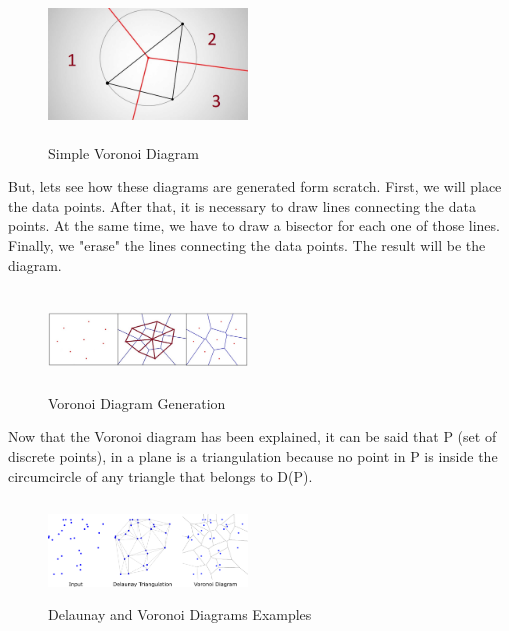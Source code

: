 \documentclass[conference]{IEEEtran}
\begin{document}
\begin{figure}[H]
    \centering
    \includegraphics[width=200,height=150,keepaspectratio]{maxresdefault2.jpg}
    \caption{Simple Voronoi Diagram}
    \label{fig:VoronoiDiagram1}
\end{figure}

But, lets see how these diagrams are generated form scratch. First, we will place the data points. After that, it is necessary to draw lines connecting the data points. At the same time, we have to draw a bisector for each one of those lines. Finally, we "erase" the lines connecting the data points. The result will be the diagram.

\begin{figure}[H]
    \centering
    \includegraphics[width=200,height=100,keepaspectratio]{DiagramGeneration.jpg}
    \caption{Voronoi Diagram Generation}
    \label{fig:VoronoiDiagram1}
\end{figure}

Now that the Voronoi diagram has been explained, it can be said that P (set of discrete points), in a plane is a triangulation because no point in P is inside the circumcircle of any triangle that belongs to D(P).

\begin{figure}[H]
    \centering
    \includegraphics[width=200,height=100,keepaspectratio]{Delaunay&VoronoiDiagrams.png}
    \caption{Delaunay and Voronoi Diagrams Examples}
    \label{fig:Delaunay&Voronoi}
\end{figure}
\end{document}
